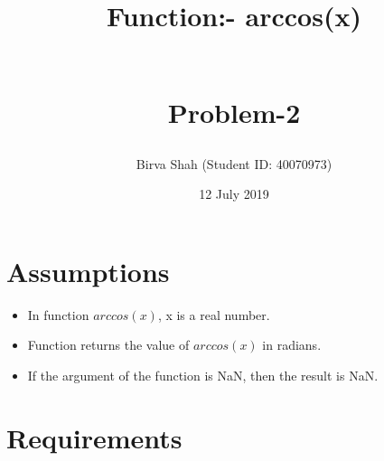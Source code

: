 \documentclass{article}
\title{Function:- arccos(x)
\begin{large}
\\
\Large Problem-2
\end{large}
}
\author{Birva Shah (Student ID: 40070973) }
\date{12 July 2019}
\begin{document}
\maketitle
\section{Assumptions}
\begin{itemize}
    \item In function $arccos(x)$, x is a real number.
    \item Function returns the value of $arccos(x)$ in radians. 
    \item If the argument of the function is NaN, then the result is NaN.
\end{itemize}  
\section{Requirements}
\end{document}
